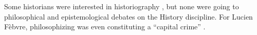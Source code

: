 Some historians were interested in historiography \cite{carbonellHistoriographie1981}, but none were going to philosophical and epistemological debates on the History discipline.
For Lucien Fèbvre, philosophizing was even constituting a ``capital crime'' \cite{febvreVersAutreHistoire1949}.

